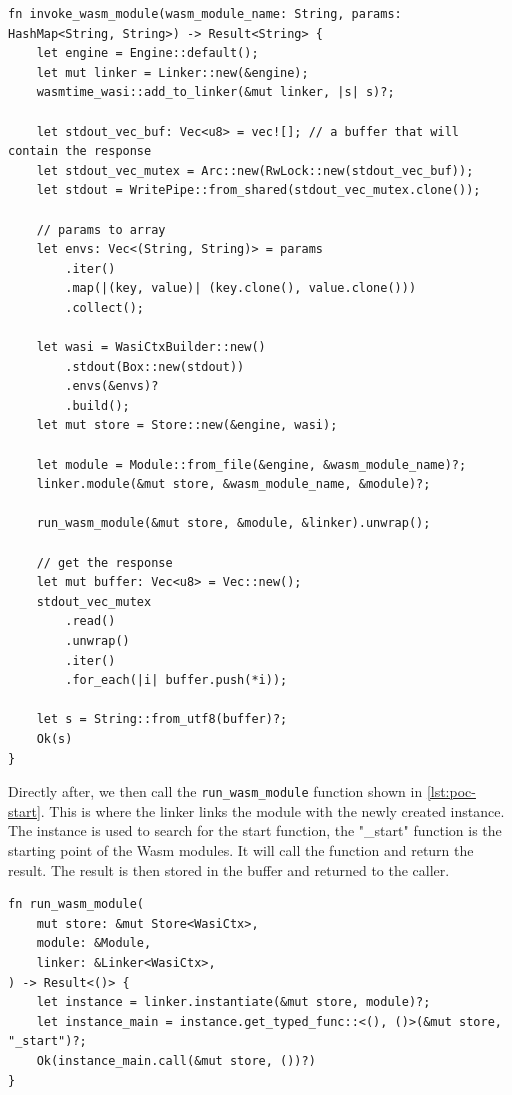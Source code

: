 \begin{lstlisting}[frame=lines, style=Rust, caption={invocation function}, showstringspaces=false, label={lst:poc-invocation}, captionpos=b]
fn invoke_wasm_module(wasm_module_name: String, params: HashMap<String, String>) -> Result<String> {
    let engine = Engine::default();
    let mut linker = Linker::new(&engine);
    wasmtime_wasi::add_to_linker(&mut linker, |s| s)?;

    let stdout_vec_buf: Vec<u8> = vec![]; // a buffer that will contain the response
    let stdout_vec_mutex = Arc::new(RwLock::new(stdout_vec_buf));
    let stdout = WritePipe::from_shared(stdout_vec_mutex.clone());

    // params to array
    let envs: Vec<(String, String)> = params
        .iter()
        .map(|(key, value)| (key.clone(), value.clone()))
        .collect();

    let wasi = WasiCtxBuilder::new()
        .stdout(Box::new(stdout))
        .envs(&envs)?
        .build();
    let mut store = Store::new(&engine, wasi);

    let module = Module::from_file(&engine, &wasm_module_name)?;
    linker.module(&mut store, &wasm_module_name, &module)?;

    run_wasm_module(&mut store, &module, &linker).unwrap();

    // get the response
    let mut buffer: Vec<u8> = Vec::new();
    stdout_vec_mutex
        .read()
        .unwrap()
        .iter()
        .for_each(|i| buffer.push(*i));

    let s = String::from_utf8(buffer)?;
    Ok(s)
}
\end{lstlisting}
%
Directly after, we then call the \texttt{run\_wasm\_module} function shown in \ref{lst:poc-start}. This is where the linker links the module with the newly created instance. The instance is used to search for the start function, the "\_start" function is the starting point of the Wasm modules. It will call the function and return the result. The result is then stored in the buffer and returned to the caller.
%
\begin{lstlisting}[frame=lines, style=Rust, caption={calling the wasm start function}, showstringspaces=false, label={lst:poc-start}, captionpos=b]
fn run_wasm_module(
    mut store: &mut Store<WasiCtx>,
    module: &Module,
    linker: &Linker<WasiCtx>,
) -> Result<()> {
    let instance = linker.instantiate(&mut store, module)?;
    let instance_main = instance.get_typed_func::<(), ()>(&mut store, "_start")?;
    Ok(instance_main.call(&mut store, ())?)
}
\end{lstlisting}
